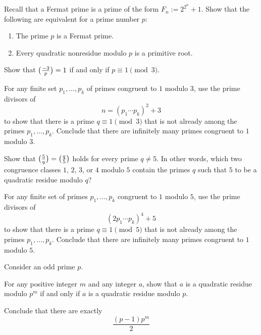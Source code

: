 \begin{challenge}
  \exercise Recall that a Fermat prime is a prime of the form $F_n:=2^{2^n}+1$. Show that the following are equivalent for a prime number $p$:
  \begin{enumerate}
  \item The prime $p$ is a Fermat prime.
  \item Every quadratic nonresidue modulo $p$ is a primitive root.
  \end{enumerate}
  \exercise
  \begin{subexenum}
  \item Show that $\legendre{-3}{p}=1$ if and only if $p\equiv 1\pmod{3}$.
  \item For any finite set $p_1,\ldots,p_k$ of primes congruent to $1$ modulo $3$, use the prime divisors of
    \begin{equation*}
      n=(p_1\cdots p_k)^2+3
    \end{equation*}
    to show that there is a prime $q\equiv 1\pmod{3}$ that is not already among the primes $p_1,\ldots,p_k$. Conclude that there are infinitely many primes congruent to $1$ modulo $3$.
  \end{subexenum}
  \exercise \label{exercise:legendre-5}
  \begin{subexenum}
  \item Show that $\legendre{5}{q}=\legendre{q}{5}$ holds for every prime $q\neq 5$. In other words, which two congruence classes $1$, $2$, $3$, or $4$ modulo $5$ contain the primes $q$ such that $5$ to be a quadratic residue modulo $q$?
  \item For any finite set of primes $p_1,\ldots,p_k$ congruent to $1$ modulo $5$, use the prime divisors of
    \begin{equation*}
      (2p_1\cdots p_k)^4+5
    \end{equation*}
    to show that there is a prime $q\equiv 1\pmod{5}$ that is not already among the primes $p_1,\ldots,p_k$. Conclude that there are infinitely many primes congruent to $1$ modulo $5$.
  \end{subexenum}
  \exercise Consider an odd prime $p$.
  \begin{subexenum}
  \item For any positive integer $m$ and any integer $a$, show that $a$ is a quadratic residue modulo $p^m$ if and only if $a$ is a quadratic residue modulo $p$.
  \item Conclude that there are exactly
  \begin{equation*}
    \frac{(p-1)p^{m}}{2}

\end{equation*}
\end{subexenum}
\end{challenge}
